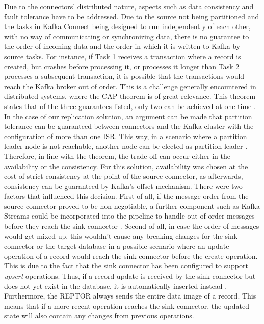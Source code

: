 Due to the connectors' distributed nature, aspects such as data consistency and fault tolerance have to be addressed. Due to the source not being partitioned and the tasks in Kafka Connect being designed to run independently of each other, with no way of communicating or synchronizing data, there is no guarantee to the order of incoming data and the order in which it is written to Kafka by source tasks. For instance, if Task 1 receives a transaction where a record is created, but crashes before processing it, or processes it longer than Task 2 processes a subsequent transaction, it is possible that the transactions would reach the Kafka broker out of order. This is a challenge generally encountered in distributed systems, where the \ac{CAP} theorem is of great relevance. This theorem states that of the three guarantees listed, only two can be achieved at one time \cite{nookala2022distributedshift}. In the case of our replication solution, an argument can be made that partition tolerance can be guaranteed between connectors and the Kafka cluster with the configuration of more than one \ac{ISR}. This way, in a scenario where a partition leader node is not reachable, another node can be elected as partition leader \cite{optimizingkafkacap}. Therefore, in line with the theorem, the trade-off can occur either in the availability or the consistency. For this solution, availability was chosen at the cost of strict consistency at the point of the source connector, as afterwards, consistency can be guaranteed by Kafka's offset mechanism. There were two factors that influenced this decision. First of all, if the message order from the source connector proved to be non-negotiable, a further component such as Kafka Streams could be incorporated into the pipeline to handle out-of-order messages before they reach the sink connector \cite{wang2021consistency}. Second of all, in case the order of messages would get mixed up, this wouldn't cause any breaking changes for the sink connector or the target database in a possible scenario where an update operation of a record would reach the sink connector before the create operation. This is due to the fact that the sink connector has been configured to support \textit{upsert} operations. Thus, if a record update is received by the sink connector but does not yet exist in the database, it is automatically inserted instead \cite{jdbcsinkdocumentation}. Furthermore, the \ac{REPTOR} always sends the entire data image of a record. This means that if a more recent operation reaches the sink connector, the updated state will also contain any changes from previous operations.

